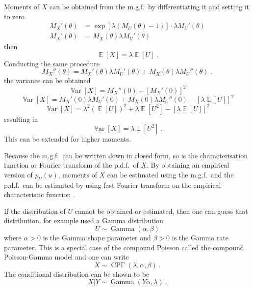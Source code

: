 \documentclass[12pt, a4paper]{memoir}
\DeclareMathOperator{\expectation}{\mathbb{E}}
\DeclareMathOperator{\variance}{\mathbb{V}ar}
\DeclareMathOperator{\gammaDist}{Gamma}
\DeclareMathOperator{\CPoisson}{CP\Gamma}
\begin{document}
Moments of $X$ can be obtained from the m.g.f.~by differentiating it and setting it to zero
\begin{align*}
M_X'(\theta)&=\exp\left[\lambda\left(M_U(\theta)-1\right)\right]\cdot\lambda M_U'(\theta) \\
M_X'(\theta)&=M_X(\theta)\lambda M_U'(\theta)
\end{align*}
then
\begin{equation}
\expectation\left[X\right]=\lambda\expectation\left[U\right] \ .
\end{equation}
Conducting the same procedure
\begin{equation*}
M_X''(\theta)=M_X'(\theta)\lambda M_U'(\theta)+M_X(\theta)\lambda M_U''(\theta) \ ,
\end{equation*}
the variance can be obtained
\begin{equation*}
\variance\left[X\right]=M_X''(0)-\left[M_X'(0)\right]^2
\end{equation*}
\begin{equation*}
\variance\left[X\right]=M_X'(0)\lambda M_U'(0)+M_X(0)\lambda M_U''(0)-\left[\lambda\expectation\left[U\right]\right]^2
\end{equation*}
\begin{equation*}
\variance\left[X\right]=\lambda^2 \left(\expectation\left[U\right]\right)^2+\lambda \expectation\left[U^2\right]-\left[\lambda\expectation\left[U\right]\right]^2
\end{equation*}
resulting in
\begin{equation}
\variance\left[X\right] = \lambda\expectation\left[U^2\right] \ .
\end{equation}
This can be extended for higher moments.

Because the m.g.f.~can be written down in closed form, so is the characterisation function or Fourier transform of the p.d.f.~of $X$. By obtaining an empirical version of $p_U(u)$, moments of $X$ can be estimated using the m.g.f.~and the p.d.f.~can be estimated by using fast Fourier transform on the empirical characteristic function \citep{whiting2006properties}.

If the distribution of $U$ cannot be obtained or estimated, then one can guess that distribution. \cite{xu2009electronic} for example used a Gamma distribution
\begin{equation}
U\sim\gammaDist\left(\alpha,\beta\right)
\end{equation}
where $\alpha>0$ is the Gamma shape parameter and $\beta>0$ is the Gamma rate parameter. This is a special case of the compound Poisson called the compound Poisson-Gamma model and one can write
\begin{equation}
X\sim\CPoisson(\lambda,\alpha,\beta) \ .
\end{equation}
The conditional distribution can be shown to be
\begin{equation}
X|Y\sim\gammaDist\left(Y\alpha,\lambda\right) \ .
\end{equation}
\end{document}
